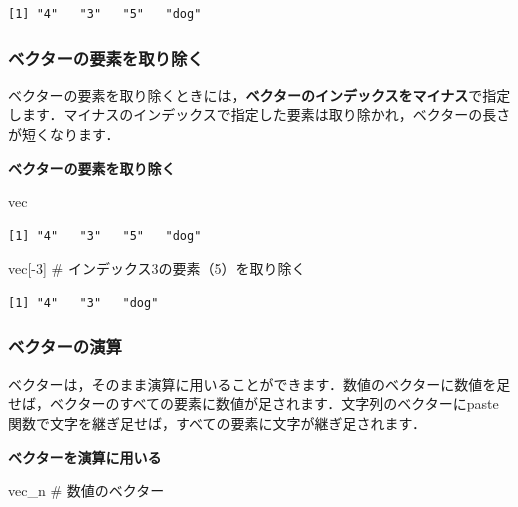 \documentclass[
  letterpaper,
  DIV=11,
  numbers=noendperiod]{scrreprt}
\newenvironment{Shaded}{\begin{snugshade}}{\end{snugshade}}
\newcommand{\CommentTok}[1]{\textcolor[rgb]{0.37,0.37,0.37}{#1}}
\newcommand{\DecValTok}[1]{\textcolor[rgb]{0.68,0.00,0.00}{#1}}
\newcommand{\NormalTok}[1]{\textcolor[rgb]{0.00,0.23,0.31}{#1}}
\newcommand{\SpecialCharTok}[1]{\textcolor[rgb]{0.37,0.37,0.37}{#1}}
\begin{document}
\begin{verbatim}
[1] "4"   "3"   "5"   "dog"
\end{verbatim}

\hypertarget{ux30d9ux30afux30bfux30fcux306eux8981ux7d20ux3092ux53d6ux308aux9664ux304f}{%
\subsubsection{ベクターの要素を取り除く}\label{ux30d9ux30afux30bfux30fcux306eux8981ux7d20ux3092ux53d6ux308aux9664ux304f}}

ベクターの要素を取り除くときには，\textbf{ベクターのインデックスをマイナス}で指定します．マイナスのインデックスで指定した要素は取り除かれ，ベクターの長さが短くなります．

\textbf{ベクターの要素を取り除く}

\begin{Shaded}
\begin{Highlighting}[]
\NormalTok{vec}
\end{Highlighting}
\end{Shaded}

\begin{verbatim}
[1] "4"   "3"   "5"   "dog"
\end{verbatim}

\begin{Shaded}
\begin{Highlighting}[]
\NormalTok{vec[}\SpecialCharTok{{-}}\DecValTok{3}\NormalTok{] }\CommentTok{\# インデックス3の要素（5）を取り除く}
\end{Highlighting}
\end{Shaded}

\begin{verbatim}
[1] "4"   "3"   "dog"
\end{verbatim}

\hypertarget{ux30d9ux30afux30bfux30fcux306eux6f14ux7b97}{%
\subsubsection{ベクターの演算}\label{ux30d9ux30afux30bfux30fcux306eux6f14ux7b97}}

ベクターは，そのまま演算に用いることができます．数値のベクターに数値を足せば，ベクターのすべての要素に数値が足されます．文字列のベクターにpaste関数で文字を継ぎ足せば，すべての要素に文字が継ぎ足されます．

\textbf{ベクターを演算に用いる}

\begin{Shaded}
\begin{Highlighting}[]
\NormalTok{vec\_n }\CommentTok{\# 数値のベクター}
\end{Highlighting}
\end{Shaded}
\end{document}
